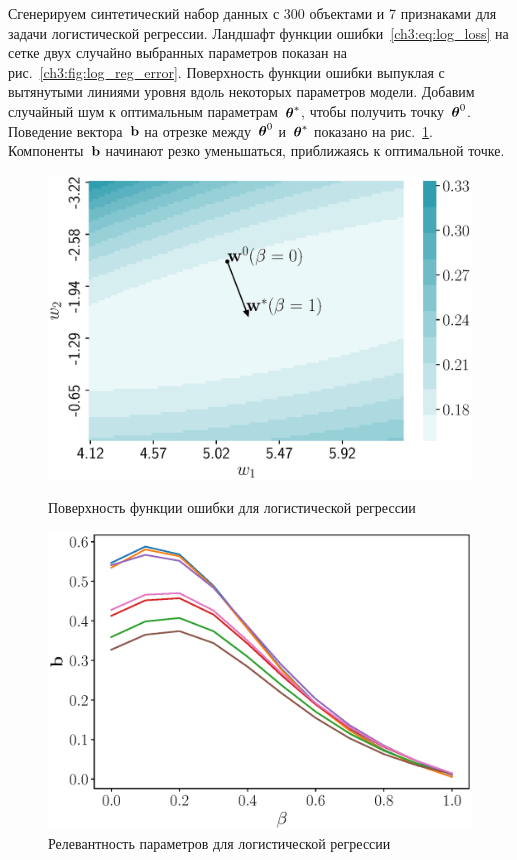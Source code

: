 Сгенерируем синтетический набор данных с 300 объектами и 7 признаками для задачи логистической регрессии. 
Ландшафт функции ошибки~\eqref{ch3:eq:log_loss} на сетке двух случайно выбранных параметров показан на рис.~\ref{ch3:fig:log_reg_error}.
Поверхность функции ошибки выпуклая с вытянутыми линиями уровня вдоль некоторых параметров модели.
Добавим случайный шум к оптимальным параметрам~$\boldsymbol{\theta}^*$, чтобы получить точку~$\boldsymbol{\theta}^0$. Поведение вектора~$\mathbf{b}$ на отрезке между~$\boldsymbol{\theta}^0$ и~$\boldsymbol{\theta}^*$ показано на рис.~\ref{ch3:fig:log_reg_b_wrt_beta}.
Компоненты~$\mathbf{b}$ начинают резко уменьшаться, приближаясь к оптимальной точке.
\begin{figure}
	\centering
	\begin{minipage}{.47\textwidth}
		\centering
		\includegraphics[width=\linewidth]{figs/ch3/log_reg_error}
		\caption{Поверхность функции ошибки для логистической регрессии}
		\label{ch3:fig:log_reg_error}
	\end{minipage}%
	\begin{minipage}{.47\textwidth}
		\centering
		\includegraphics[width=\linewidth]{figs/ch3/log_reg_b_wrt_beta}
		\caption{Релевантность параметров для логистической регрессии}
		\label{ch3:fig:log_reg_b_wrt_beta}
	\end{minipage}
\end{figure}

